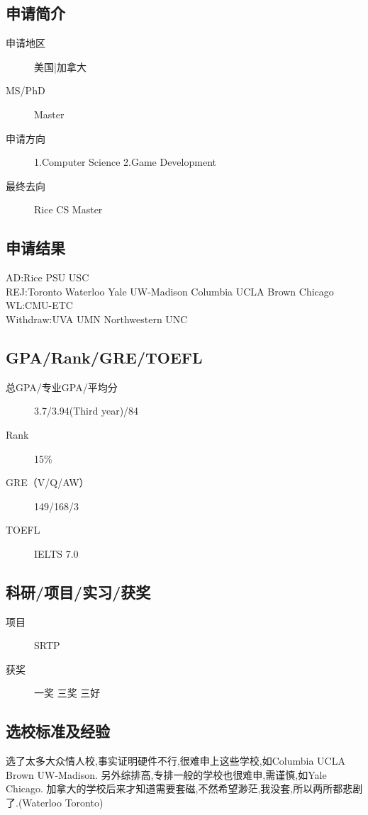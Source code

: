 \documentclass[11pt,fleqn,openany]{book} %
\begin{document}
\noindent\begin{minipage}[t]{0.45\textwidth}
\subsection*{申请简介}
\begin{description}
\item[申请地区] 美国|加拿大
\item[MS/PhD] Master
\item[申请方向] 1.Computer Science  2.Game Development
\item[最终去向] Rice CS Master
\end{description}
\end{minipage}
\hfill
\begin{minipage}[t]{0.45\textwidth}
\subsection*{申请结果}
\noindent AD:Rice PSU USC\\
REJ:Toronto Waterloo Yale UW-Madison Columbia UCLA Brown Chicago \\
WL:CMU-ETC\\
Withdraw:UVA UMN Northwestern UNC
\end{minipage}
\subsection*{GPA/Rank/GRE/TOEFL}
\begin{description}
\item[总GPA/专业GPA/平均分] 3.7/3.94(Third year)/84
\item[Rank] 15\%
\item[GRE（V/Q/AW）] 149/168/3
\item[TOEFL] IELTS 7.0
\end{description}

\subsection*{科研/项目/实习/获奖}
\begin{description}
\item[项目] SRTP
\item[获奖] 一奖 三奖 三好
\end{description}
\subsection*{选校标准及经验}
选了太多大众情人校,事实证明硬件不行,很难申上这些学校,如Columbia UCLA Brown UW-Madison.
另外综排高,专排一般的学校也很难申,需谨慎,如Yale Chicago.
加拿大的学校后来才知道需要套磁,不然希望渺茫,我没套,所以两所都悲剧了.(Waterloo Toronto)
\end{document}

